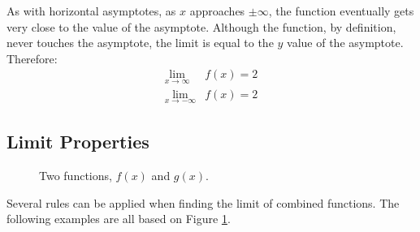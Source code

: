 \documentclass[12pt]{article}
\begin{document}
As with horizontal asymptotes, as $x$ approaches $\pm \infty$, the function eventually gets very close to the value of the asymptote. Although the function, by definition, never touches the asymptote, the limit is equal to the $y$ value of the asymptote. Therefore:
\begin{align*}
	\lim_{x \to \infty} & f(x) = 2 \\
	\lim_{x \to -\infty} & f(x) = 2
\end{align*}

\subsection{Limit Properties}
\begin{figure}[H]
	\begin{center}
		\caption{Two functions, $f(x)$ and $g(x)$.}
		\label{fig:limproperties}
	\end{center}
\end{figure}

Several rules can be applied when finding the limit of combined functions. The following examples are all based on Figure \ref{fig:limproperties}.
\end{document}
